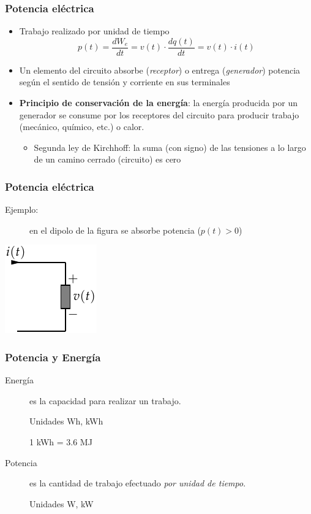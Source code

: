 \documentclass[serif, xcolor=dvipsnames]{beamer}
\begin{document}
\begin{frame}
  \frametitle{Potencia eléctrica}
  \begin{itemize}
  \item Trabajo realizado por unidad de tiempo
    \[
    p(t)=\frac{dW_{e}}{dt}=v(t)\cdot\frac{dq(t)}{dt}=v(t)\cdot i(t)
    \]

  \item Un elemento del circuito absorbe (\emph{receptor}) o entrega
    (\emph{generador}) potencia según el sentido de tensión y
    corriente en sus terminales
  \item \textbf{Principio de conservación de la energía}: la energía
    producida por un generador se consume por los receptores del
    circuito para producir trabajo (mecánico, químico, etc.) o calor.

    \begin{itemize}
    \item Segunda ley de Kirchhoff: la suma (con signo) de las
      tensiones a lo largo de un camino cerrado (circuito) es cero
    \end{itemize}
  \end{itemize}

\end{frame}
\begin{frame}
  \frametitle{Potencia eléctrica}
  \begin{description}
  \item [{Ejemplo:}] en el dipolo de la figura se absorbe potencia
    ($p(t)>0$)
  \end{description}
  \begin{center}
    \includegraphics{../figs/ReceptorPasivo}
    \par\end{center}


\end{frame}
\begin{frame}
  \frametitle{Potencia y Energía}
  \begin{description}
  \item [{Energía}] es la capacidad para realizar un trabajo.


    Unidades Wh, kWh


    1 kWh = 3.6 MJ

  \item [{Potencia}] es la cantidad de trabajo efectuado \emph{por
      unidad de tiempo}.


    Unidades W, kW

  \end{description}

\end{frame}
\end{document}
